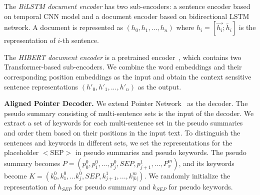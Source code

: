 The \textit{BiLSTM document encoder} has two sub-encoders: a sentence encoder based on temporal CNN model and a document encoder based on bidirectional LSTM network. 
A document is represented as $(h_0,h_1,...,h_n)$ where $h_i = [\overrightarrow{h_i};\overleftarrow{h_i}]$ is the representation of $i$-th sentence.

%
The \textit{HIBERT document encoder} is a pretrained encoder~\cite{HiBert19},
which contains two Transformer-based sub-encoders.
We combine the word embeddings and their corresponding position embeddings as the input and obtain the context sensitive sentence
representations $(h'_0,h'_1,...,h'_n)$ as the output.

\textbf{Aligned Pointer Decoder.} 
We extend Pointer Network~\cite{PointNet15} as the decoder.
The pseudo summary consisting of multi-sentence sets is the input of the decoder.
We extract a set of keywords for each multi-sentence set in the pseudo summaries and 
order them based on their positions in the input text.
To distinguish the sentences and keywords in different sets, 
we set the representations for the
placeholder $<$SEP$>$ in pseudo summaries and pseudo keywords.
The pseudo summary becomes $P=(p^0_0,p^0_1,...,p^0_j,SEP,p^1_{j+1},...,P^m_x)$,
and its keywords become $K=(k^0_0,k^0_1,...k^0_j,SEP,k^1_{j+1},...,k^m_{|k|})$.
We randomly initialize the representation of $h_{SEP}$ for pseudo summary and $k_{SEP}$ for pseudo keywords. 

